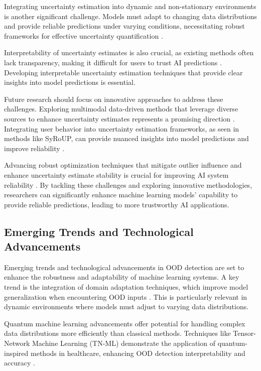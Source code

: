 Integrating uncertainty estimation into dynamic and non-stationary environments is another significant challenge. Models must adapt to changing data distributions and provide reliable predictions under varying conditions, necessitating robust frameworks for effective uncertainty quantification \cite{walz2023easyuncertaintyquantificationeasyuq}.

Interpretability of uncertainty estimates is also crucial, as existing methods often lack transparency, making it difficult for users to trust AI predictions \cite{ramosaj2021interpretablemachinesconstructingvalid}. Developing interpretable uncertainty estimation techniques that provide clear insights into model predictions is essential.

Future research should focus on innovative approaches to address these challenges. Exploring multimodal data-driven methods that leverage diverse sources to enhance uncertainty estimates represents a promising direction \cite{lopez2023informativepriorsimprovereliability}. Integrating user behavior into uncertainty estimation frameworks, as seen in methods like SyRoUP, can provide nuanced insights into model predictions and improve reliability \cite{sicilia2024accountingsycophancylanguagemodel}.

Advancing robust optimization techniques that mitigate outlier influence and enhance uncertainty estimate stability is crucial for improving AI system reliability \cite{li2024robustsecondordernonconvexoptimization}. By tackling these challenges and exploring innovative methodologies, researchers can significantly enhance machine learning models' capability to provide reliable predictions, leading to more trustworthy AI applications.

\subsection{Emerging Trends and Technological Advancements} \label{subsec:Emerging Trends and Technological Advancements}

Emerging trends and technological advancements in OOD detection are set to enhance the robustness and adaptability of machine learning systems. A key trend is the integration of domain adaptation techniques, which improve model generalization when encountering OOD inputs \cite{lang2023survey}. This is particularly relevant in dynamic environments where models must adjust to varying data distributions.

Quantum machine learning advancements offer potential for handling complex data distributions more efficiently than classical methods. Techniques like Tensor-Network Machine Learning (TN-ML) demonstrate the application of quantum-inspired methods in healthcare, enhancing OOD detection interpretability and accuracy \cite{an2023intelligentdiagnosticschemelung}.

